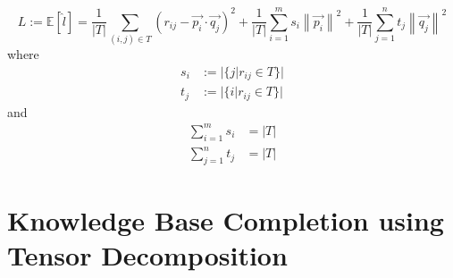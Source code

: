 \documentclass[11pt, english]{article}
\newcommand\norm[1]{\left\lVert#1\right\rVert}
\begin{document}
 \begin{equation}
    L:= \mathbb{E}[\hat{l}]=\frac{1}{|T|}\sum\limits_{(i,j)\in T}(r_{ij}-\vec{p_{i}}\cdot\vec{q_{j}})^2+\frac{1}{|T|}\sum\limits_{i=1}^{m} s_i\norm{\vec{p_i}}^2+\frac{1}{|T|}\sum\limits_{j=1}^{n} t_j\norm{\vec{q_{j}}}^2
 \end{equation}
 where
 \begin{align}
      s_i &:=  |\{j|r_{ij}\in T\}| \\
      t_j  &:=  |\{i|r_{ij} \in T\}|
 \end{align}
 and 
 \begin{align}
     \sum\limits_{i=1}^{m} s_i &= |T|  \\
     \sum\limits_{j=1}^{n} t_j &= |T|
 \end{align}

\section{Knowledge Base Completion using Tensor Decomposition}





\end{document}
